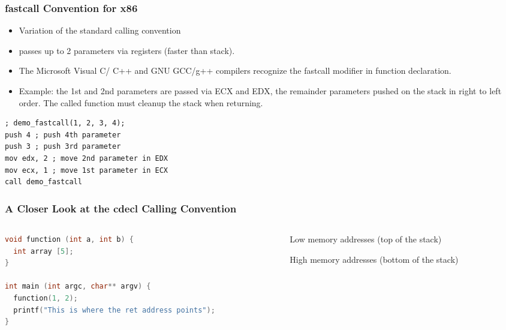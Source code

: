 \documentclass[]{beamer}
\begin{document}
\begin{frame}[fragile]
  \frametitle{fastcall Convention for x86}
  \begin{itemize}
  \item{Variation of the standard calling convention}
  \item {passes up to 2 parameters via registers (faster than stack).}
  \item{The Microsoft Visual C/ C++ and GNU GCC/g++ compilers recognize the \color{red}fastcall \color{black} modifier in function declaration.}
  \item{Example: the 1st and 2nd parameters are passed via ECX and EDX, the remainder parameters pushed on the stack in right to left order. The called function must cleanup the stack when returning.}
  \end{itemize}
\begin{lstlisting}[language={[x86masm]Assembler}]
; demo_fastcall(1, 2, 3, 4);
push 4 ; push 4th parameter
push 3 ; push 3rd parameter
mov edx, 2 ; move 2nd parameter in EDX
mov ecx, 1 ; move 1st parameter in ECX
call demo_fastcall
\end{lstlisting}
\end{frame}

\begin{frame}[fragile]
  \frametitle{A Closer Look at the cdecl Calling Convention}
  \begin{columns}
    \begin{column}{.5\textwidth}
\begin{lstlisting}[language=C]
void function (int a, int b) {
  int array [5];
}

int main (int argc, char** argv) {
  function(1, 2);
  printf("This is where the ret address points");
}
\end{lstlisting}
    \end{column}
    \begin{column}{.5\textwidth}
      \begin{center}
        {\tiny Low memory addresses (top of the stack)}
        \begin{center}
        \end{center}
        {\tiny High memory addresses (bottom of the stack)}
      \end{center}

    \end{column}
  \end{columns}
\end{frame}
\end{document}
